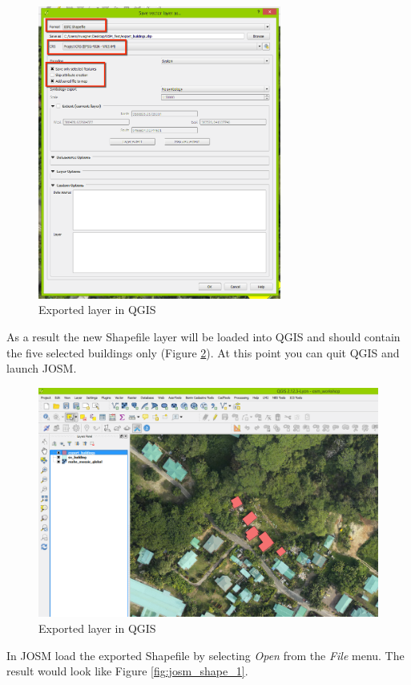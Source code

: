 \documentclass[a4paper,12pt,titlepage]{article}
\begin{document}
\begin{figure}[H]
	\centering
	\includegraphics[width=8cm]{Images/qgis_2.png}
	\caption{Exported layer in QGIS}\label{fig:qgis_2}
\end{figure}

As a result the new Shapefile layer will be loaded into QGIS and should contain the five selected buildings only (Figure \ref{fig:qgis_3}). At this point you can quit QGIS and launch JOSM.

\begin{figure}[H]
	\centering
	\includegraphics[width=12cm]{Images/qgis_3.png}
	\caption{Exported layer in QGIS}\label{fig:qgis_3}
\end{figure}

In JOSM load the exported Shapefile by selecting \textit{Open} from the \textit{File} menu. The result would look like Figure \ref{fig:josm_shape_1}.
\end{document}
